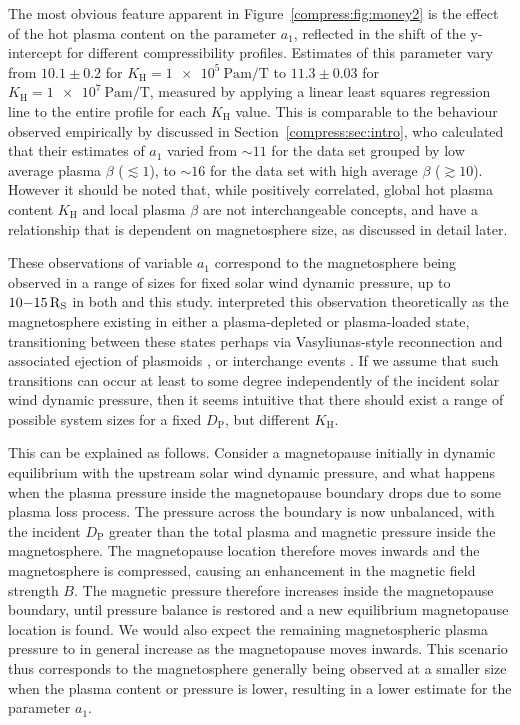 The most obvious feature apparent in Figure~\ref{compress:fig:money2} is the effect of the hot plasma content on the parameter $a_1$, reflected in the shift of the y-intercept for different compressibility profiles. Estimates of this parameter vary from $10.1 \pm 0.2$ for $K_\mathrm{H}=\SI{1e5}{\pascal\meter\per\tesla}$ to $11.3 \pm 0.03$ for $K_\mathrm{H}=\SI{1e7}{\pascal\meter\per\tesla}$, measured by applying a linear least squares regression line to the entire profile for each $K_\mathrm{H}$ value. This is comparable to the behaviour observed empirically by \citet{pilkington2015} discussed in Section~\ref{compress:sec:intro}, who calculated that their estimates of $a_1$ varied from ${\sim}11$ for the data set grouped by low average plasma $\beta$ ($\lesssim 1$), to ${\sim}16$ for the data set with high average $\beta$ ($\gtrsim 10$). However it should be noted that, while positively correlated, global hot plasma content $K_\mathrm{H}$ and local plasma $\beta$ are not interchangeable concepts, and have a relationship that is dependent on magnetosphere size, as discussed in detail later. 

These observations of variable $a_1$ correspond to the magnetosphere being observed in a range of sizes for fixed solar wind dynamic pressure, up to $10{\--}\SI{15}{R_S}$ in both \citet{pilkington2015} and this study. \citet{pilkington2015} interpreted this observation theoretically as the magnetosphere existing in either a plasma-depleted or plasma-loaded state, transitioning between these states perhaps via Vasyliunas-style reconnection and associated ejection of plasmoids \citep{vasyliunas1983}, or interchange events \citep{mitchell2015}. If we assume that such transitions can occur at least to some degree independently of the incident solar wind dynamic pressure, then it seems intuitive that there should exist a range of possible system sizes for a fixed $D_\mathrm{P}$, but different $K_\mathrm{H}$. 

This can be explained as follows. Consider a magnetopause initially in dynamic equilibrium with the upstream solar wind dynamic pressure, and what happens when the plasma pressure inside the magnetopause boundary drops due to some plasma loss process. The pressure across the boundary is now unbalanced, with the incident $D_\mathrm{P}$ greater than the total plasma and magnetic pressure inside the magnetosphere. The magnetopause location therefore moves inwards and the magnetosphere is compressed, causing an enhancement in the magnetic field strength $B$. The magnetic pressure therefore increases inside the magnetopause boundary, until pressure balance is restored and a new equilibrium magnetopause location is found. We would also expect the remaining magnetospheric plasma pressure to in general increase as the magnetopause moves inwards. This scenario thus corresponds to the magnetosphere generally being observed at a smaller size when the plasma content or pressure is lower, resulting in a lower estimate for the parameter $a_1$.


